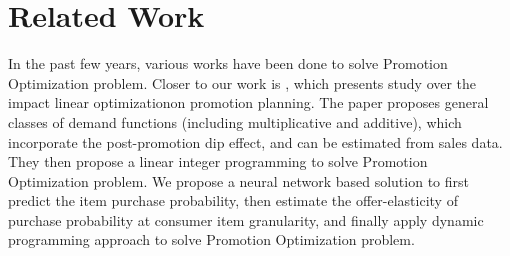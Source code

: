 \section{Related Work}
\label{sec:relatedwork}
In the past few years, various works have been done to solve Promotion Optimization problem.
Closer to our work is \cite{fader2009probability}, which presents study over the impact 
linear optimizationon promotion planning. The paper proposes general classes of demand functions 
(including multiplicative and additive), which incorporate the post-promotion dip effect, and can 
be estimated from sales data. They then propose a linear integer programming to solve Promotion
Optimization problem. We propose a neural network based solution to first predict the 
item purchase probability, then estimate the offer-elasticity of purchase probability at consumer item granularity,
and finally apply dynamic programming approach to solve Promotion Optimization problem.